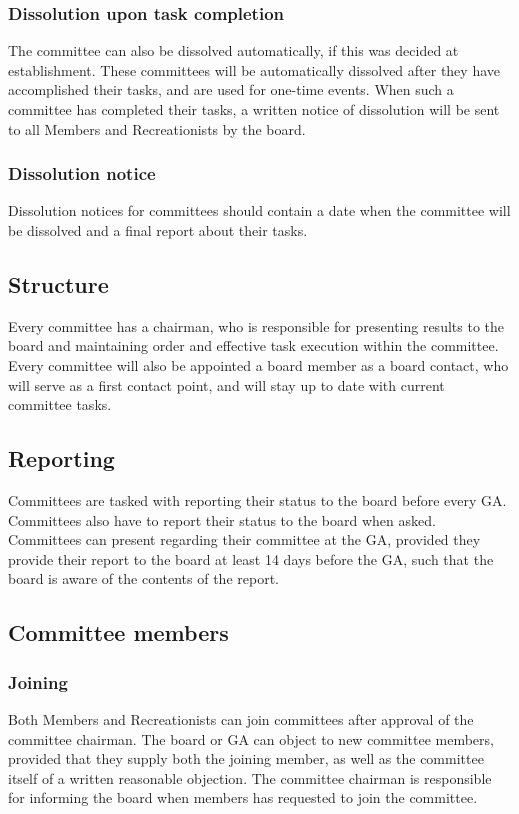 \documentclass[a4paper]{article}
\begin{document}
\subsubsection{Dissolution upon task completion}
The committee can also be dissolved automatically, if this was decided at establishment. These committees will be automatically dissolved after they have accomplished their tasks, and are used for one-time events. When such a committee has completed their tasks, a written notice of dissolution will be sent to all Members and Recreationists by the board.

\subsubsection{Dissolution notice}
Dissolution notices for committees should contain a date when the committee will be dissolved and a final report about their tasks.

\subsection{Structure}
Every committee has a chairman, who is responsible for presenting results to the board and maintaining order and effective task execution within the committee. Every committee will also be appointed a board member as a board contact, who will serve as a first contact point, and will stay up to date with current committee tasks.

\subsection{Reporting}
Committees are tasked with reporting their status to the board before every GA. Committees also have to report their status to the board when asked. Committees can present regarding their committee at the GA, provided they provide their report to the board at least 14 days before the GA, such that the board is aware of the contents of the report.

\subsection{Committee members}
\subsubsection{Joining}
Both Members and Recreationists can join committees after approval of the committee chairman. The board or GA can object to new committee members, provided that they supply both the joining member, as well as the committee itself of a written reasonable objection. The committee chairman is responsible for informing the board when members has requested to join the committee.
\end{document}
